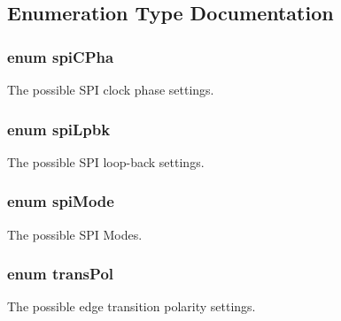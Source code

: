 \subsection{Enumeration Type Documentation}
\hypertarget{a00051_a0701b982f4dc80e47f32c3419a27f1d9}{
\subsubsection[{spi\-C\-Pha}]{\setlength{\rightskip}{0pt plus 5cm}enum {\bf spi\-C\-Pha}}}\label{a00051_a0701b982f4dc80e47f32c3419a27f1d9}
The possible S\-P\-I clock phase settings. \hypertarget{a00051_ab94a5ba6760c1a12ee032dd12fffd6a3}{
\subsubsection[{spi\-Lpbk}]{\setlength{\rightskip}{0pt plus 5cm}enum {\bf spi\-Lpbk}}}\label{a00051_ab94a5ba6760c1a12ee032dd12fffd6a3}
The possible S\-P\-I loop-\/back settings. \hypertarget{a00051_afb5b84cea8395f82ed709dbd8dcc82ce}{
\subsubsection[{spi\-Mode}]{\setlength{\rightskip}{0pt plus 5cm}enum {\bf spi\-Mode}}}\label{a00051_afb5b84cea8395f82ed709dbd8dcc82ce}
The possible S\-P\-I Modes. \hypertarget{a00051_ab694d7b7f6041ac353aa1475e9c39ddc}{
\subsubsection[{trans\-Pol}]{\setlength{\rightskip}{0pt plus 5cm}enum {\bf trans\-Pol}}}\label{a00051_ab694d7b7f6041ac353aa1475e9c39ddc}
The possible edge transition polarity settings. 

